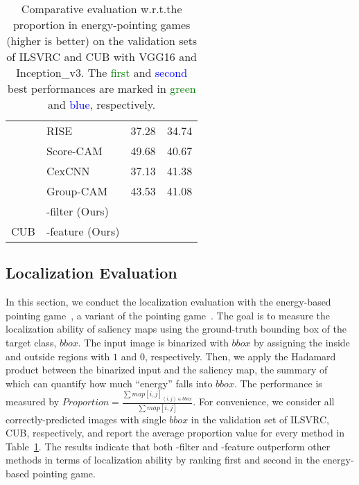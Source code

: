 \begin{table}[ht]
{\begin{tabular}{p{2cm}<{\centering}|p{3cm}<{\centering}|p{1.8cm}<{\centering} p{1.8cm}<{\centering}}
                          & RISE\cite{petsiuk2018rise}                       & 37.28           & 34.74   \\
                          & Score-CAM\cite{wang2019score}               
                          &  49.68       &  40.67             \\
                          & CexCNN\cite{debbi2021causal}               
                          &  37.13        &   41.38      \\
                          & Group-CAM\cite{zhang2021group}              
                          & 43.53         &  41.08        \\
                          & \cellcolor[HTML]{EFEFEF}\name{}-filter (Ours) & \cellcolor[HTML]{EFEFEF}{\textcolor{Green}{51.74}} & \cellcolor[HTML]{EFEFEF}{\textcolor{Green}{42.03}} \\
\multirow{-9}{*}{CUB}    & \cellcolor[HTML]{EFEFEF}\name{}-feature (Ours) & \cellcolor[HTML]{EFEFEF}{\textcolor{blue}{49.97}} & \cellcolor[HTML]{EFEFEF}{\textcolor{blue}{41.96}}  \\ \bottomrule[0.8pt]
\end{tabular}
}
\caption{
Comparative evaluation w.r.t.\;the proportion in energy-pointing games (higher is better) on the validation sets of ILSVRC and CUB with VGG16 and Inception\_v3. The \textcolor{Green} {first} and \textcolor{blue} {second} best performances are marked in \textcolor{Green} {green} and \textcolor{blue} {blue}, respectively.
}
\label{tab:Loc}
\end{table}

\subsection{Localization Evaluation}
In this section, we conduct the localization evaluation with the energy-based pointing game~\cite{wang2019score}, a variant of the pointing game~\cite{petsiuk2018rise}.
The goal is to measure the localization ability of saliency maps using the ground-truth bounding box of the target class, $bbox$.
The input image is binarized with $bbox$ by assigning the inside and outside regions with $1$ and $0$, respectively. 
Then, we apply the Hadamard product between the binarized input and the saliency map, the summary of which can quantify how much ``energy'' falls into $bbox$.
The performance is measured by $Proportion=\frac{\sum map[i,j]_{(i,j)\in bbox}}{\sum map[i,j]}$.
For convenience, we consider all correctly-predicted images with single $bbox$ in the validation set of ILSVRC, CUB, respectively, and report the average proportion value for every method in Table~\ref{tab:Loc}. 
The results indicate that both \name{}-filter and \name{}-feature outperform other methods in terms of localization ability by ranking first and second in the energy-based pointing game.



